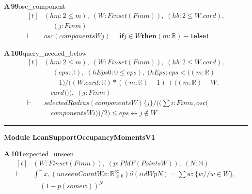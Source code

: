 \documentclass[conference]{IEEEtran}
\theoremstyle{definition}
\newcommand{\lean}[1]{\textsf{\footnotesize #1}}
\begin{document}
\noindent\textbf{A\,99}\quad\lean{osc\_component}
{\footnotesize\[ \begin{aligned}[t]
&(\mathit{hm} : 2 \leq \mathit{m}),\; (\mathit{W} : \mathit{Finset} (\mathit{Fin} \mathit{m})),\; (\mathit{hb} : 2 \leq \mathit{W}.\mathit{card}),\\
&\quad \; (\mathit{j} : \mathit{Fin} \mathit{m})\\
\vdash\;&\mathit{osc} (\mathit{components} \mathit{W} \mathit{j}) = \mathbf{if} \mathit{j} \in \mathit{W} \mathbf{then} (\mathit{m}:\mathbb{R} )-1 \mathbf{else} 1
\end{aligned} \]}

\noindent\textbf{A\,100}\quad\lean{query\_needed\_below}
{\footnotesize\[ \begin{aligned}[t]
&(\mathit{hm} : 2 \leq \mathit{m}),\; (\mathit{W} : \mathit{Finset} (\mathit{Fin} \mathit{m})),\; (\mathit{hb} : 2 \leq \mathit{W}.\mathit{card}),\\
&\quad \; (\mathit{eps} : \mathbb{R} ),\; (\mathit{hEps0} : 0 \leq \mathit{eps}),\; (\mathit{hEps} : \mathit{eps} < ((\mathit{m}:\mathbb{R} )\\
&\quad -1)/((\mathit{W}.\mathit{card}:\mathbb{R} )*((\mathit{m}:\mathbb{R} )-1) + ((\mathit{m}:\mathbb{R} ) - \mathit{W}.\\
&\quad \mathit{card}))),\; (\mathit{j} : \mathit{Fin} \mathit{m})\\
\vdash\;&\mathit{selectedRadius} (\mathit{components} \mathit{W}) \{ \mathit{j}\} / ((\textstyle\sum \mathit{i} : \mathit{Fin} \mathit{m}, \mathit{osc} (\\
&\quad \mathit{components} \mathit{W} \mathit{i}))/2) \leq \mathit{eps} \leftrightarrow \mathit{j} \notin \mathit{W}
\end{aligned} \]}

\vspace{4pt}\noindent\rule{\columnwidth}{0.4pt}\par\vspace{2pt}
\noindent\textbf{Module \lean{LeanSupportOccupancyMomentsV1}}\par\vspace{3pt}

\noindent\textbf{A\,101}\quad\lean{expected\_unseen}
{\footnotesize\[ \begin{aligned}[t]
&(\mathit{W} : \mathit{Finset} (\mathit{Fin} \mathit{m})),\; (\mathit{p} : \mathit{PMF} (\mathit{Points} \mathit{W})),\; (\mathit{N} : \mathbb{N} )\\
\vdash\;&\int^{-} \mathit{x}, (\mathit{unseenCount} \mathit{W} \mathit{x} : \mathbb{R}_{\geq0}^{\infty} ) ∂(\mathit{iid} \mathit{W} \mathit{p} \mathit{N}) = \textstyle\sum \mathit{w} : \{ \mathit{w} // \mathit{w} \in \mathit{W}\} ,\\
&\quad (1 - \mathit{p} (\mathit{some} \mathit{w}))^{\mathit{N}}
\end{aligned} \]}
\end{document}
